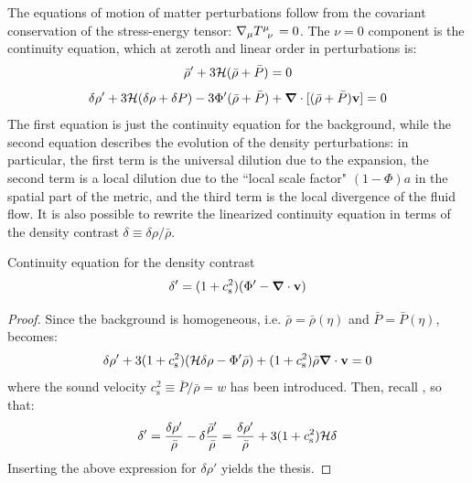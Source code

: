 The equations of motion of matter perturbations follow from the covariant conservation of the stress-energy tensor: $ \na_\mu \tensor{T}{^\mu_\nu} = 0 $. The $ \nu = 0 $ component is the continuity equation, which at zeroth and linear order in perturbations is:
\begin{equation}
  \bar \rho' + 3 \mathcal{H} (\bar \rho + \bar P) = 0
  \label{eq:continuity-friedmann}
\end{equation}
\begin{equation}
  \delta \rho' + 3 \mathcal{H} (\delta \rho + \delta P) - 3 \Phi' (\bar \rho + \bar P) + \boldsymbol{\nabla}\cdot [(\bar \rho + \bar P) \mathbf{v}] = 0
  \label{eq:continuity-first}
\end{equation}
The first equation is just the continuity equation  for the background, while the second equation describes the evolution of the density perturbations: in particular, the first term is the universal dilution due to the expansion, the second term is a local dilution due to the ``local scale factor" $ (1 - \Phi) a $ in the spatial part of the metric, and the third term is the local divergence of the fluid flow. It is also possible to rewrite the linearized continuity equation in terms of the density contrast $ \delta \equiv \delta \rho / \bar \rho $.

\begin{proposition}[before upper = {\tcbtitle}]{Continuity equation for the density contrast}{}
  \begin{equation}
    \delta' = (1 + c_\text{s}^2) (\Phi' - \boldsymbol{\nabla}\cdot \mathbf{v})
  \end{equation}
\end{proposition}

\begin{proofbox}
  \begin{proof}
    Since the background is homogeneous, i.e. $ \bar \rho = \bar \rho (\eta) $ and $ \bar P = \bar P (\eta) $,  becomes:
    \begin{equation*}
      \delta \rho' + 3 (1 + c_\text{s}^2) (\mathcal{H} \delta \rho - \Phi' \bar \rho) + (1 + c_\text{s}^2) \bar \rho \boldsymbol{\nabla}\cdot \mathbf{v} = 0
    \end{equation*}
    where the sound velocity $ c_\text{s}^2 \equiv \bar P / \bar \rho = w $ has been introduced. Then, recall , so that:
    \begin{equation*}
      \delta' = \frac{\delta \rho'}{\bar \rho} - \delta \frac{\bar \rho'}{\bar \rho} = \frac{\delta \rho'}{\bar \rho} + 3 (1 + c_\text{s}^2) \mathcal{H} \delta
    \end{equation*}
    Inserting the above expression for $ \delta \rho' $ yields the thesis.
  \end{proof}
\end{proofbox}

